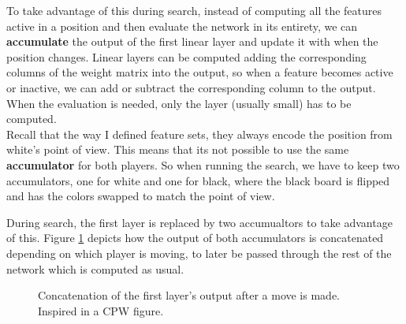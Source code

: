To take advantage of this during search, instead of computing all the features active in a position and then evaluate the network in its entirety, we can \textbf{accumulate} the output of the first linear layer and update it with when the position changes. Linear layers can be computed adding the corresponding columns of the weight matrix into the output, so when a feature becomes active or inactive, we can add or subtract the corresponding column to the output. When the evaluation is needed, only the layer (usually small) has to be computed. \\

Recall that the way I defined feature sets, they always encode the position from white's point of view. This means that its not possible to use the same \textbf{accumulator} for both players. So when running the search, we have to keep two accumulators, one for white and one for black, where the black board is flipped and has the colors swapped to match the point of view.


%
%
%
%
%
%
%
%
%
%
%
%
%
%
%
%
%
%
%
%
%


During search, the first layer is replaced by two accumualtors to take advantage of this. Figure \ref{fig:incr_update} depicts how the output of both accumulators is concatenated depending on which player is moving, to later be passed through the rest of the network which is computed as usual. 

\begin{figure}[H]
\centering
{}
\caption{Concatenation of the first layer's output after a move is made. Inspired in a CPW figure.}
\label{fig:incr_update}
\end{figure}

